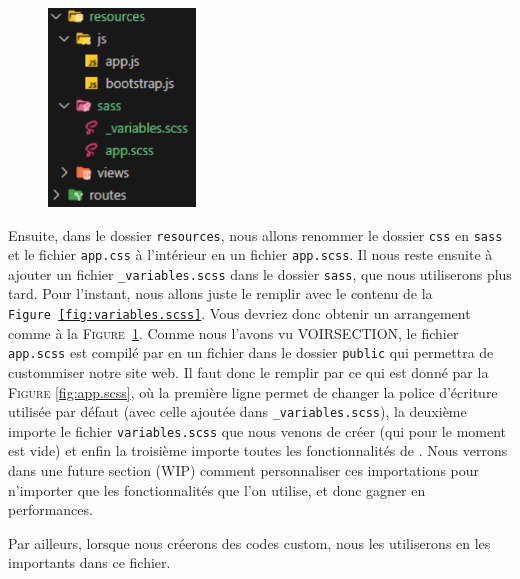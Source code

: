 \begin{figure}
    \vspace{-0.5cm}
    \includegraphics[width=0.35\textwidth]{figures-C1/bs_setup.pdf}
    \caption{\label{fig:bs_setup}}
\end{figure}
Ensuite, dans le dossier \verb|resources|, nous allons renommer le dossier \verb|css| en \verb|sass| et le fichier \verb|app.css| à l'intérieur en un fichier \verb|app.scss|. Il nous reste ensuite à ajouter un fichier \verb|_variables.scss| dans le dossier \verb|sass|, que nous utiliserons plus tard. Pour l'instant, nous allons juste le remplir avec le contenu de la \texttt{Figure~\ref{fig:variables.scss}}. Vous devriez donc obtenir un arrangement comme à la \textsc{Figure~\ref{fig:bs_setup}}. Comme nous l'avons vu VOIRSECTION, le fichier \verb|app.scss| est compilé par \vite{} en un fichier \css{} dans le dossier \verb|public| qui permettra de custommiser notre site web. Il faut donc le remplir par ce qui est donné par la \textsc{Figure }\ref{fig:app.scss}, où la première ligne permet de changer la police d'écriture utilisée par défaut (avec celle ajoutée dans \verb|_variables.scss|), la deuxième importe le fichier \verb|variables.scss| que nous venons de créer (qui pour le moment est vide) et enfin la troisième importe toutes les fonctionnalités de \bs{}. Nous verrons dans une future section (WIP) comment personnaliser ces importations pour n'importer que les fonctionnalités que l'on utilise, et donc gagner en performances. 

Par ailleurs, lorsque nous créerons des codes \sass{} custom, nous les utiliserons en les importants dans ce fichier.

